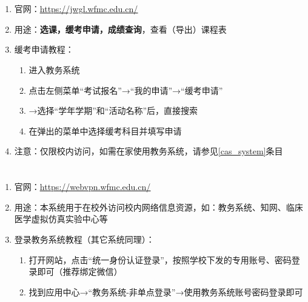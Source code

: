\section[教务系统]{\textbf{}}
\begin{enumerate}
    \item 官网：\uline{\href{https://jwgl.wfmc.edu.cn/}{https://jwgl.wfmc.edu.cn/}}
    \item 用途：\textbf{选课，缓考申请，成绩查询}，查看（导出）课程表
    \item 缓考申请教程：
    \begin{enumerate}
        \item 进入教务系统
        \item 点击左侧菜单“考试报名”→“我的申请”→“缓考申请”
        \item →选择“学年学期”和“活动名称”后，直接搜索
        \item 在弹出的菜单中选择缓考科目并填写申请\footnotemark
    \end{enumerate}
    \item 注意：仅限校内访问，如需在家使用教务系统，请参见\uline{\ref{cas_system}}条目
\end{enumerate}

\section[资源访问控制系统]{\textbf{}\footnotemark}
\label{cas_system}
\begin{enumerate}
    \item 官网：\uline{\href{https://webvpn.wfmc.edu.cn/}{https://webvpn.wfmc.edu.cn/}}
    \item 用途：本系统用于在校外访问校内网络信息资源，如：教务系统、知网、临床医学虚拟仿真实验中心\footnotemark 等
    \item 登录教务系统教程（其它系统同理）：
    \begin{enumerate}
        \item 打开网站，点击“统一身份认证登录”，按照学校下发的专用账号、密码登录即可（推荐绑定微信）
        \item 找到应用中心→“教务系统-非单点登录”\footnotemark →使用教务系统账号密码登录即可
    \end{enumerate}
\end{enumerate}

